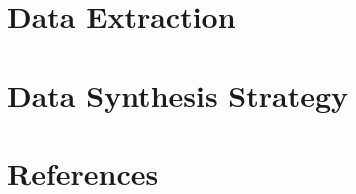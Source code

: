 \documentclass[
]{article}
\begin{document}
\hypertarget{data-extraction}{%
\section{Data Extraction}\label{data-extraction}}

\hypertarget{data-synthesis-strategy}{%
\section{Data Synthesis Strategy}\label{data-synthesis-strategy}}

\hypertarget{references}{%
\section{References}\label{references}}

\hypertarget{refs}{}
\end{document}
